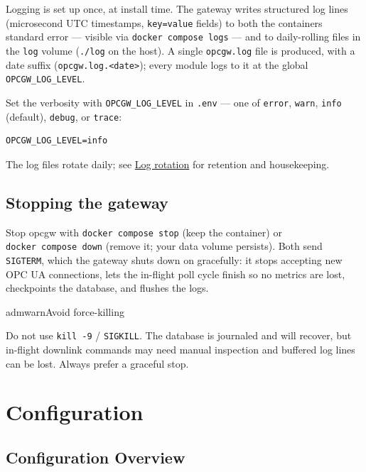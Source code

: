 Logging is set up once, at install time. The gateway writes structured log lines (microsecond UTC timestamps, \texttt{key=value} fields) to both the container\textquotesingle s standard error --- visible via \texttt{docker\ compose\ logs} --- and to daily-rolling files in the \texttt{log} volume (\texttt{./log} on the host). A single \texttt{opcgw.log} file is produced, with a date suffix (\texttt{opcgw.log.\textless{}date\textgreater{}}); every module logs to it at the global \texttt{OPCGW\_LOG\_LEVEL}.

Set the verbosity with \texttt{OPCGW\_LOG\_LEVEL} in \texttt{.env} --- one of \texttt{error}, \texttt{warn}, \texttt{info} (default), \texttt{debug}, or \texttt{trace}:

\begin{lstlisting}
OPCGW_LOG_LEVEL=info
\end{lstlisting}

The log files rotate daily; see \hyperref[sec-log-rotation]{Log rotation} for retention and housekeeping.

\section{Stopping the gateway}\label{sec-install-stop}

Stop opcgw with \texttt{docker\ compose\ stop} (keep the container) or \texttt{docker\ compose\ down} (remove it; your data volume persists). Both send \texttt{SIGTERM}, which the gateway shuts down on gracefully: it stops accepting new OPC UA connections, lets the in-flight poll cycle finish so no metrics are lost, checkpoints the database, and flushes the logs.

\begin{admonition}{admwarn}{Avoid force-killing}

Do not use \texttt{kill\ -9} / \texttt{SIGKILL}. The database is journaled and will recover, but in-flight downlink commands may need manual inspection and buffered log lines can be lost. Always prefer a graceful stop.

\end{admonition}

\chapter{Configuration}\label{ch-configuration}

\section{Configuration Overview}\label{sec-config-overview}

